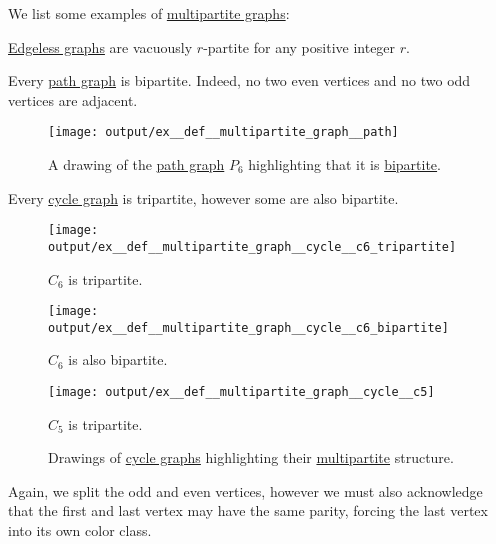 \begin{example}\label{ex:def:multipartite_graph}
  We list some examples of \hyperref[def:multipartite_graph]{multipartite graphs}:
  \begin{thmenum}
     \hyperref[def:edgeless_graph]{Edgeless graphs} are vacuously \( r \)-partite for any positive integer \( r \).

     Every \hyperref[def:path_graph]{path graph} is bipartite. Indeed, no two even vertices and no two odd vertices are adjacent.
    \begin{figure}[!ht]
      \centering
      \texttt{[image: output/ex\_\_def\_\_multipartite\_graph\_\_path]}
      \caption{A drawing of the \hyperref[def:path_graph]{path graph} \( P_6 \) highlighting that it is \hyperref[def:multipartite_graph]{bipartite}.}\label{fig:ex:def:multipartite_graph/path}
    \end{figure}

     Every \hyperref[def:cycle_graph]{cycle graph} is tripartite, however some are also bipartite.

    \begin{figure}[!ht]
    \hfill
      \begin{subcaptionblock}{0.3\textwidth}
        \centering
        \texttt{[image: output/ex\_\_def\_\_multipartite\_graph\_\_cycle\_\_c6\_tripartite]}
        \caption{\( C_6 \) is tripartite.}\label{fig:ex:def:multipartite_graph/cycle/c6_tripartite}
      \end{subcaptionblock}
      \hfill
      \begin{subcaptionblock}{0.3\textwidth}
        \centering
        \texttt{[image: output/ex\_\_def\_\_multipartite\_graph\_\_cycle\_\_c6\_bipartite]}
        \caption{\( C_6 \) is also bipartite.}\label{fig:ex:def:multipartite_graph/cycle/c6_bipartite}
      \end{subcaptionblock}
      \hfill
      \begin{subcaptionblock}{0.3\textwidth}
        \centering
        \texttt{[image: output/ex\_\_def\_\_multipartite\_graph\_\_cycle\_\_c5]}
        \caption{\( C_5 \) is tripartite.}\label{fig:ex:def:multipartite_graph/cycle/c5}
      \end{subcaptionblock}
      \caption{Drawings of \hyperref[def:cycle_graph]{cycle graphs} highlighting their \hyperref[def:multipartite_graph]{multipartite} structure.}\label{fig:ex:def:multipartite_graph/cycle}
    \end{figure}

    Again, we split the odd and even vertices, however we must also acknowledge that the first and last vertex may have the same parity, forcing the last vertex into its own color class.
  \end{thmenum}
\end{example}


